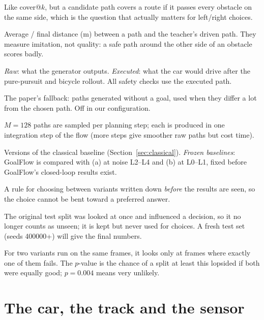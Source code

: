 \documentclass[11pt,a4paper]{article}
\begin{document}
\begin{description}[style=nextline,leftmargin=0pt]
  \item[Homotopy cover] Like cover@$k$, but a candidate path covers a route if it passes every obstacle on
        the same side, which is the question that actually matters for left/right choices.
  \item[ADE / FDE] Average / final distance (m) between a path and the teacher's driven path. They measure
        imitation, not quality: a safe path around the other side of an obstacle scores badly.
  \item[Raw vs executed path] \emph{Raw}: what the generator outputs. \emph{Executed}: what the car would
        drive after the pure-pursuit and bicycle rollout. All safety checks use the executed path.
  \item[Shadow path] The paper's fallback: paths generated without a goal, used when they differ a lot from
        the chosen path. Off in our configuration.
  \item[M, Euler steps] $M=128$ paths are sampled per planning step; each is produced in one integration
        step of the flow (more steps give smoother raw paths but cost time).
  \item[Configs (a)--(d)] Versions of the classical baseline (Section~\ref{sec:classical}).
        \emph{Frozen baselines}: GoalFlow is compared with (a) at noise L2--L4 and (b) at L0--L1, fixed before
        GoalFlow's closed-loop results exist.
  \item[Pre-registered rule] A rule for choosing between variants written down \emph{before} the results
        are seen, so the choice cannot be bent toward a preferred answer.
  \item[Spent / frozen test split] The original test split was looked at once and influenced a decision, so
        it no longer counts as unseen; it is kept but never used for choices. A fresh test set (seeds 400000+)
        will give the final numbers.
  \item[McNemar's test, $p$-value] For two variants run on the same frames, it looks only at frames where
        exactly one of them fails. The $p$-value is the chance of a split at least this lopsided if both were
        equally good; $p=0.004$ means very unlikely.
\end{description}

\section{The car, the track and the sensor}
\end{document}
